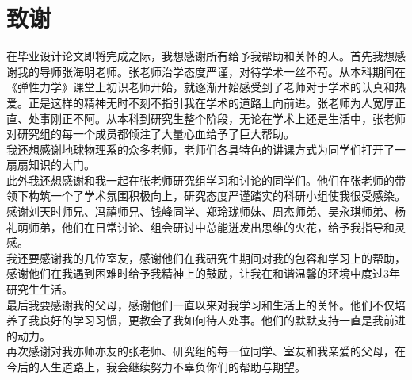 
\chapter{致谢}
\indent 在毕业设计论文即将完成之际，我想感谢所有给予我帮助和关怀的人。首先我想感谢我的导师张海明老师。张老师治学态度严谨，对待学术一丝不苟。从本科期间在《弹性力学》课堂上初识老师开始，就逐渐开始感受到了老师对于学术的认真和热爱。正是这样的精神无时不刻不指引我在学术的道路上向前进。张老师为人宽厚正直、处事刚正不阿。从本科到研究生整个阶段，无论在学术上还是生活中，张老师对研究组的每一个成员都倾注了大量心血给予了巨大帮助。\\
\indent 我还想感谢地球物理系的众多老师，老师们各具特色的讲课方式为同学们打开了一扇扇知识的大门。\\
\indent 此外我还想感谢和我一起在张老师研究组学习和讨论的同学们。他们在张老师的带领下构筑一个了学术氛围积极向上，研究态度严谨踏实的科研小组使我很受感染。感谢刘天时师兄、冯禧师兄、钱峰同学、郑玲珑师妹、周杰师弟、吴永琪师弟、杨礼萌师弟，他们在日常讨论、组会研讨中总能迸发出思维的火花，给予我指导和灵感。 \\
\indent 我还要感谢我的几位室友，感谢他们在我研究生期间对我的包容和学习上的帮助，感谢他们在我遇到困难时给予我精神上的鼓励，让我在和谐温馨的环境中度过3年研究生生活。\\ 
\indent 最后我要感谢我的父母，感谢他们一直以来对我学习和生活上的关怀。他们不仅培养了我良好的学习习惯，更教会了我如何待人处事。他们的默默支持一直是我前进的动力。\\ 
\indent 再次感谢对我亦师亦友的张老师、研究组的每一位同学、室友和我亲爱的父母，在今后的人生道路上，我会继续努力不辜负你们的帮助与期望。

